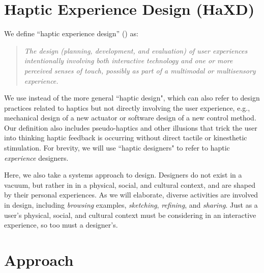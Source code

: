 \section{Haptic Experience Design (HaXD)}
We define ``haptic experience design'' (\haxd) as:
\begin{quote}
\it The design (planning, development, and evaluation) of user experiences intentionally involving both interactive technology and one or more perceived senses of touch, possibly as part of a multimodal or multisensory experience.
\end{quote}
We use \haxd instead of the more general ``haptic design", which can also refer to design practices related to haptics but not directly involving the user experience, e.g., mechanical design of a new actuator or software design of a new control method.
Our definition also includes pseudo-haptics \cite{Pusch2011} and other illusions that trick the user into thinking haptic feedback is occurring without direct tactile or kinesthetic stimulation.
For brevity, we will use ``haptic designers" to refer to haptic \emph{experience} designers.



Here, we also take a systems approach to design.
Designers do not exist in a vacuum, but rather in in a physical, social, and cultural context, and are shaped by their personal experiences.
As we will elaborate, diverse activities are involved in design, including \emph{browsing} examples, \emph{sketching}, \emph{refining}, and \emph{sharing}.
Just as a user's physical, social, and cultural context must be considering in an interactive experience, so too must a designer's.


\section{Approach}

